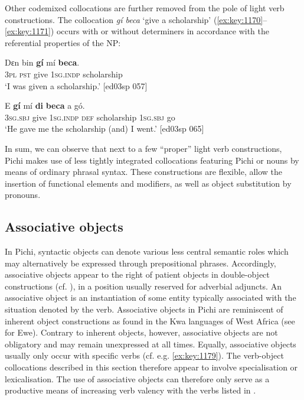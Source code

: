 Other codemixed collocations are further removed from the pole of light verb constructions. The collocation \textit{gí beca} ‘give a scholarship’ (\ref{ex:key:1170}–\ref{ex:key:1171}) occurs with or without determiners in accordance with the referential properties of the \textsc{NP}: 


\ea%
    \label{ex:key:1170}
    \gll Dɛn  bin  \textbf{gí}  mí    \textbf{beca}.\\
\textsc{3pl}  \textsc{pst}  give  \textsc{1sg.indp}  scholarship\\

\glt ‘I was given a scholarship.’ [ed03sp 057]
\z


\ea%
    \label{ex:key:1171}
    \gll E    \textbf{gí}  mí    \textbf{di}  \textbf{beca}      a    gó.\\
\textsc{3sg.sbj}  give  \textsc{1sg.indp}  \textsc{def}  scholarship  \textsc{1sg.sbj}  go\\

\glt ‘He gave me the scholarship (and) I went.’ [ed03sp 065]
\z

In sum, we can observe that next to a few “proper” light verb constructions, Pichi makes use of less tightly integrated collocations featuring Pichi or  nouns by means of ordinary phrasal syntax. These constructions are flexible, allow the insertion of functional elements and modifiers, as well as object substitution by pronouns.

\subsection{Associative objects}\label{sec:9.3.2}

In Pichi, syntactic objects can denote various less central semantic roles which may alternatively be expressed through prepositional phrases. Accordingly, associative objects appear to the right of patient objects in double-object constructions (cf. ), in a position usually reserved for adverbial adjuncts. An associative object is an instantiation of some entity typically associated with the situation denoted by the verb. Associative objects in Pichi are reminiscent of inherent object constructions as found in the Kwa languages of West Africa (see \citealt{Essegbey1999} for Ewe). Contrary to inherent objects, however, associative objects are not obligatory and may remain unexpressed at all times. Equally, associative objects usually only occur with specific verbs (cf. e.g. \ref{ex:key:1179}). The verb-object collocations described in this section therefore appear to involve specialisation or lexicalisation. The use of associative objects can therefore only serve as a productive means of increasing verb valency with the verbs listed in . 


